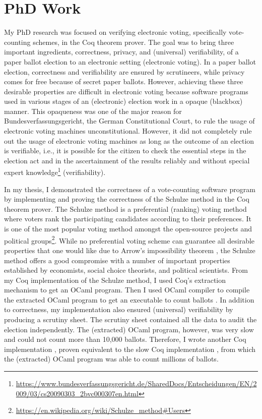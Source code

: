 \documentclass[a4paper]{article}
\begin{document}
\section{PhD Work}
My PhD research was focused on verifying electronic voting, specifically vote-counting schemes, in 
the Coq theorem prover. The goal was to 
bring  three important ingredients, correctness, privacy, and (universal) verifiability, of a paper ballot election to 
an electronic setting (electronic voting). In a paper ballot election, correctness and verifiability are
ensured by scrutineers, while privacy 
comes for free because of secret paper ballots.  However, achieving these three desirable properties 
are difficult in electronic voting because software programs used in 
various stages of an (electronic) election work in a opaque (blackbox) manner. This 
opaqueness was one of the major reason for Bundesverfassungsgericht, the German Constitutional Court, 
to rule the usage of electronic voting machines unconstitutional. However, it did not 
completely rule out the usage of electronic voting machines as long as the outcome of an election 
is verifiable, i.e., it is possible for the citizen to check the essential steps in the 
election act and in the ascertainment of the results reliably and without special 
expert knowledge\footnote{\url{https://www.bundesverfassungsgericht.de/SharedDocs/Entscheidungen/EN/2009/03/cs20090303_2bvc000307en.html}} (verifiability).





In my thesis, I demonstrated the correctness of a vote-counting software program 
by implementing and proving the correctness of the Schulze method \cite{10.1007/978-3-319-66107-0_26} in the Coq theorem 
prover. 
The Schulze method is a preferential (ranking) voting method where voters rank the participating 
candidates according to their preferences. It is one of the most popular voting method amongst the open-source projects and 
political groups\footnote{\url{https://en.wikipedia.org/wiki/Schulze_method#Users}}.
While no preferential voting scheme can guarantee all
desirable properties that one would like due to Arrow's impossibility theorem \cite{arrow1950difficulty}, 
the Schulze method offers a good compromise with a number of important properties established by economists, 
social choice theorists, and political scientists. From my Coq implementation of the Schulze method,
I used Coq's extraction mechanism to get an OCaml program.
Then I used OCaml compiler to compile the extracted OCaml program to get an executable  
to count ballots \cite{10.1007/978-3-319-66107-0_26}.
In addition to correctness, my implementation also
ensured (universal) verifiability by producing a scrutiny sheet. The scrutiny sheet contained all 
the data to audit the election independently. The (extracted) OCaml program, however, was 
very slow and could not count more than 10,000 ballots. Therefore, I wrote another 
Coq implementation \cite{bennett2017no}, proven equivalent to the slow Coq 
implementation  \cite{10.1007/978-3-319-66107-0_26}, from which the (extracted) 
OCaml program was able to count millions of ballots.
\end{document}

